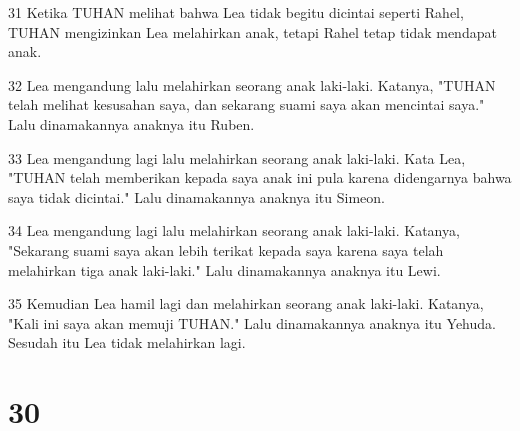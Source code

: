 \par 31 Ketika TUHAN melihat bahwa Lea tidak begitu dicintai seperti Rahel, TUHAN mengizinkan Lea melahirkan anak, tetapi Rahel tetap tidak mendapat anak.
\par 32 Lea mengandung lalu melahirkan seorang anak laki-laki. Katanya, "TUHAN telah melihat kesusahan saya, dan sekarang suami saya akan mencintai saya." Lalu dinamakannya anaknya itu Ruben.
\par 33 Lea mengandung lagi lalu melahirkan seorang anak laki-laki. Kata Lea, "TUHAN telah memberikan kepada saya anak ini pula karena didengarnya bahwa saya tidak dicintai." Lalu dinamakannya anaknya itu Simeon.
\par 34 Lea mengandung lagi lalu melahirkan seorang anak laki-laki. Katanya, "Sekarang suami saya akan lebih terikat kepada saya karena saya telah melahirkan tiga anak laki-laki." Lalu dinamakannya anaknya itu Lewi.
\par 35 Kemudian Lea hamil lagi dan melahirkan seorang anak laki-laki. Katanya, "Kali ini saya akan memuji TUHAN." Lalu dinamakannya anaknya itu Yehuda. Sesudah itu Lea tidak melahirkan lagi.

\chapter{30}

